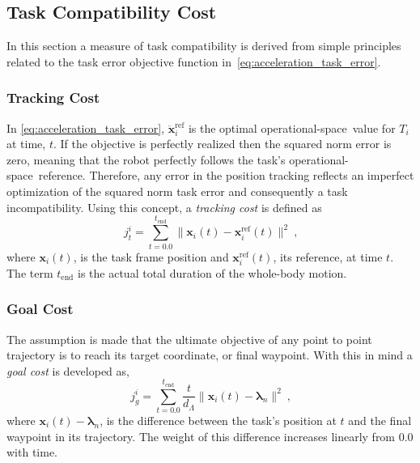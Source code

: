 \documentclass[12pt,a4paper,twoside]{article}
\newcommand{\bs}[1]{\boldsymbol{#1}}
\newcommand{\x}{\bs{x}}
\newcommand{\xdd}{\ddot{\bs{x}}}
\newcommand{\os}{operational-space}
\newcommand{\blam}{\bs{\lambda}}
\newcommand{\tc}{\ \text{,}}
\begin{document}
\subsection{Task Compatibility Cost}
\label{sec:task_compatibility_cost}
In this section a measure of task compatibility is derived from simple principles related to the task error objective function in~\eqref{eq:acceleration_task_error}.

    \subsubsection{Tracking Cost}
        In \eqref{eq:acceleration_task_error}, $\xdd^{\text{ref}}_{i}$ is the optimal \os\ value for $T_i$ at time, $t$. If the objective is perfectly realized then the squared norm error is zero, meaning that the robot perfectly follows the task's \os\ reference. Therefore, any error in the position tracking reflects an imperfect optimization of the squared norm task error and consequently a task incompatibility. Using this concept, a \textit{tracking cost} is defined as
        \begin{equation}
        \label{eq:tracking_cost}
        j_{t}^{i} = \displaystyle\sum_{t=0.0}^{t_{\text{end}}} \| \x_{i}(t) - \x_{i}^{\text{ref}}(t) \|^2 \tc
        \end{equation}
        \noindent where $\x_{i}(t)$, is the task frame position and $\x_{i}^{\text{ref}}(t)$, its reference, at time $t$. The term $t_{\text{end}}$ is the actual total duration of the whole-body motion.
    \subsubsection{Goal Cost}
        The assumption is made that the ultimate objective of any point to point trajectory is to reach its target coordinate, or final waypoint. With this in mind a \textit{goal cost} is developed as,
        \begin{equation}
        \label{eq:goal_cost}
        j_{g}^{i} = \displaystyle\sum_{t=0.0}^{t_{\text{end}}} \frac{t}{d_{\Lambda}} \| \x_{i}(t) - \blam_{n} \|^2 \tc
        \end{equation}
        \noindent where $\x_{i}(t) - \blam_{n}$, is the difference between the task's position at $t$ and the final waypoint in its trajectory. The weight of this difference increases linearly from $0.0$ with time.
\end{document}
